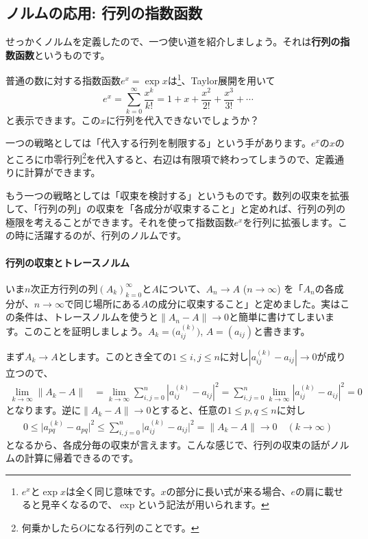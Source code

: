 \subsection{ノルムの応用: 行列の指数函数}

せっかくノルムを定義したので、一つ使い道を紹介しましょう。それは\textbf{行列の指数函数}というものです。

普通の数に対する指数函数$e^x = \exp x$は\footnote{$e^x$と$\exp x$は全く同じ意味です。$x$の部分に長い式が来る場合、$e$の肩に載せると見辛くなるので、$\exp$という記法が用いられます。}、Taylor展開を用いて
\[
e^x = \sum_{k = 0}^{\infty} \frac{x^k}{k!} = 1 + x + \frac{x^2}{2!} + \frac{x^3}{3!} + \cdots
\]
と表示できます。この$x$に行列を代入できないでしょうか？

一つの戦略としては「代入する行列を制限する」という手があります。$e^x$の$x$のところに巾零行列\footnote{何乗かしたら$O$になる行列のことです。}を代入すると、右辺は有限項で終わってしまうので、定義通りに計算ができます。

もう一つの戦略としては「収束を検討する」というものです。数列の収束を拡張して、「行列の列」の収束を「各成分が収束すること」と定めれば、行列の列の極限を考えることができます。それを使って指数函数$e^x$を行列に拡張します。この時に活躍するのが、行列のノルムです。

\paragraph{行列の収束とトレースノルム}

いま$n$次正方行列の列$(A_k)_{k = 0}^{\infty}$と$A$について、$A_n \rightarrow A$ ($n\rightarrow\infty$) を「$A_n$の各成分が、$n \rightarrow \infty$で同じ場所にある$A$の成分に収束すること」と定めました。実はこの条件は、トレースノルムを使うと$\|A_n - A\| \rightarrow 0$と簡単に書けてしまいます。このことを証明しましょう。$A_k = \bigl(a^{(k)}_{ij}\bigr)$, $A = (a_{ij})$と書きます。

まず$A_k \rightarrow A$とします。このとき全ての$1 \leq i, j \leq n$に対し$|a^{(k)}_{ij} - a_{ij}| \rightarrow 0$が成り立つので、
\begin{align*}
\lim_{k \rightarrow \infty} \|A_k - A\|
&= \lim_{k \rightarrow \infty} \sum_{i, j = 0}^n |a^{(k)}_{ij} - a_{ij}|^2 
= \sum_{i, j = 0}^n \lim_{k \rightarrow \infty} |a^{(k)}_{ij} - a_{ij}|^2 
= 0
\end{align*}
となります。逆に$\|A_k - A\| \rightarrow 0$とすると、任意の$1\leq p, q\leq n$に対し
\begin{align*}
0
\leq \bigl| a^{(k)}_{pq} - a_{pq} \bigr|^2
\leq \sum_{i, j = 0}^n \bigl| a^{(k)}_{ij} - a_{ij} \bigr|^2
= \|A_k - A\|
\rightarrow 0 \quad (k \rightarrow \infty)
\end{align*}
となるから、各成分毎の収束が言えます。こんな感じで、行列の収束の話がノルムの計算に帰着できるのです。

